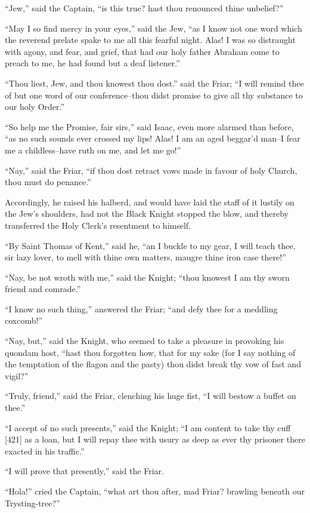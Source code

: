 ``Jew,'' said the Captain, ``is this true? hast thou renounced thine
unbelief?''

``May I so find mercy in your eyes,'' said the Jew, ``as I know not one
word which the reverend prelate spake to me all this fearful night.
Alas! I was so distraught with agony, and fear, and grief, that had our
holy father Abraham come to preach to me, he had found but a deaf
listener.''

``Thou liest, Jew, and thou knowest thou dost.'' said the Friar; ``I
will remind thee of but one word of our conference--thou didst promise
to give all thy substance to our holy Order.''

``So help me the Promise, fair sirs,'' said Isaac, even more alarmed
than before, ``as no such sounds ever crossed my lips! Alas! I am an
aged beggar'd man--I fear me a childless--have ruth on me, and let me
go!''

``Nay,'' said the Friar, ``if thou dost retract vows made in favour of
holy Church, thou must do penance.''

Accordingly, he raised his halberd, and would have laid the staff of it
lustily on the Jew's shoulders, had not the Black Knight stopped the
blow, and thereby transferred the Holy Clerk's resentment to himself.

``By Saint Thomas of Kent,'' said he, ``an I buckle to my gear, I will
teach thee, sir lazy lover, to mell with thine own matters, maugre thine
iron case there!''

``Nay, be not wroth with me,'' said the Knight; ``thou knowest I am thy
sworn friend and comrade.''

``I know no such thing,'' answered the Friar; ``and defy thee for a
meddling coxcomb!''

``Nay, but,'' said the Knight, who seemed to take a pleasure in
provoking his quondam host, ``hast thou forgotten how, that for my sake
(for I say nothing of the temptation of the flagon and the pasty) thou
didst break thy vow of fast and vigil?''

``Truly, friend,'' said the Friar, clenching his huge fist, ``I will
bestow a buffet on thee.''

``I accept of no such presents,'' said the Knight; ``I am content to
take thy cuff {[}421{]} as a loan, but I will repay thee with usury as
deep as ever thy prisoner there exacted in his traffic.''

``I will prove that presently,'' said the Friar.

``Hola!'' cried the Captain, ``what art thou after, mad Friar? brawling
beneath our Trysting-tree?''

